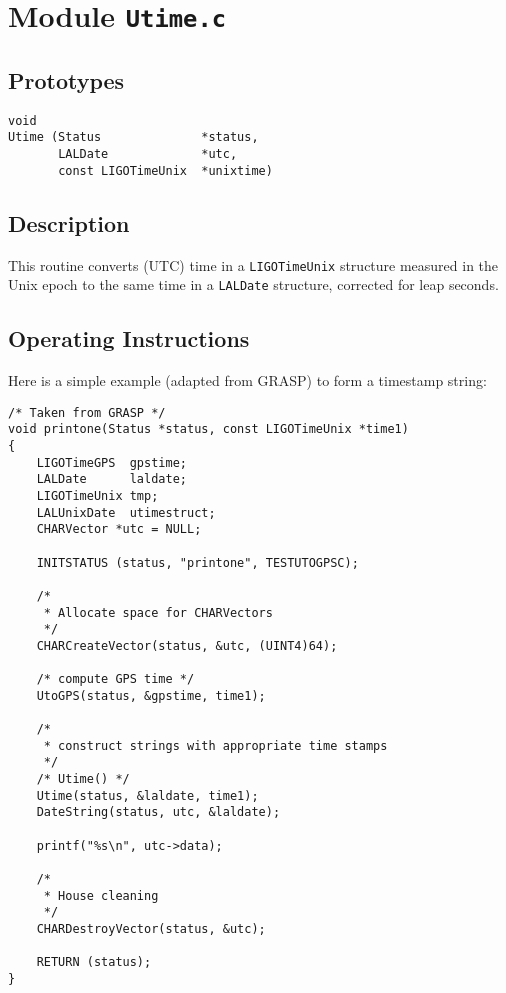 \section{Module \texttt{Utime.c}}

\subsection{Prototypes}
\begin{verbatim}
void
Utime (Status              *status,
       LALDate             *utc,
       const LIGOTimeUnix  *unixtime)
\end{verbatim}

\subsection{Description}

This routine converts (UTC) time in a \texttt{LIGOTimeUnix} structure
measured in the Unix epoch to the same time in a \texttt{LALDate}
structure, corrected for leap seconds.

\subsection{Operating Instructions}

Here is a simple example (adapted from GRASP) to form a timestamp string:

\begin{verbatim}
/* Taken from GRASP */
void printone(Status *status, const LIGOTimeUnix *time1)
{
    LIGOTimeGPS  gpstime;
    LALDate      laldate;
    LIGOTimeUnix tmp;
    LALUnixDate  utimestruct;
    CHARVector *utc = NULL;

    INITSTATUS (status, "printone", TESTUTOGPSC);

    /*
     * Allocate space for CHARVectors
     */
    CHARCreateVector(status, &utc, (UINT4)64);

    /* compute GPS time */
    UtoGPS(status, &gpstime, time1);

    /*
     * construct strings with appropriate time stamps
     */
    /* Utime() */
    Utime(status, &laldate, time1);
    DateString(status, utc, &laldate);

    printf("%s\n", utc->data);

    /*
     * House cleaning
     */
    CHARDestroyVector(status, &utc);
    
    RETURN (status);
}
\end{verbatim}

